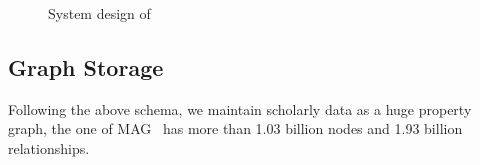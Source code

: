 \begin{figure}
\centering
{}
\vspace{-1ex}
\caption{System design of \oursystem  }
\label{fig:system}
\vspace{-2ex}
\end{figure}


\subsection{Graph Storage} \label{subsec:storage}


Following the above schema, we maintain scholarly data as a huge property graph, \eg the one of MAG~\cite{sinha2015overview}  has more than 1.03 billion nodes and 1.93 billion relationships. %


